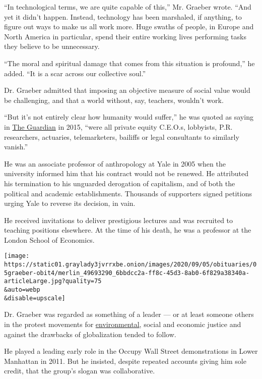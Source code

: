 ``In technological terms, we are quite capable of this,'' Mr. Graeber
wrote. ``And yet it didn't happen. Instead, technology has been
marshaled, if anything, to figure out ways to make us all work more.
Huge swaths of people, in Europe and North America in particular, spend
their entire working lives performing tasks they believe to be
unnecessary.

``The moral and spiritual damage that comes from this situation is
profound,'' he added. ``It is a scar across our collective soul.''

Dr. Graeber admitted that imposing an objective measure of social value
would be challenging, and that a world without, say, teachers, wouldn't
work.

``But it's not entirely clear how humanity would suffer,'' he was quoted
as saying in
\href{https://www.theguardian.com/books/2015/mar/21/books-interview-david-graeber-the-utopia-of-rules?paging=off}{The
Guardian} in 2015, ``were all private equity C.E.O.s, lobbyists, P.R.
researchers, actuaries, telemarketers, bailiffs or legal consultants to
similarly vanish.''

He was an associate professor of anthropology at Yale in 2005 when the
university informed him that his contract would not be renewed. He
attributed his termination to his unguarded derogation of capitalism,
and of both the political and academic establishments. Thousands of
supporters signed petitions urging Yale to reverse its decision, in
vain.

He received invitations to deliver prestigious lectures and was
recruited to teaching positions elsewhere. At the time of his death, he
was a professor at the London School of Economics.

\texttt{[image: https://static01.graylady3jvrrxbe.onion/images/2020/09/05/obituaries/05graeber-obit4/merlin\_49693290\_6bbdcc2a-ff8c-45d3-8ab0-6f829a38340a-articleLarge.jpg?quality=75\\\&auto=webp\\\&disable=upscale]}

Dr. Graeber was regarded as something of a leader --- or at least
someone others in the protest movements for
\href{https://www.nytimes3xbfgragh.onion/2019/05/01/opinion/extinction-rebellion-climate-change.html}{environmental},
social and economic justice and against the drawbacks of globalization
tended to follow.

He played a leading early role in the Occupy Wall Street demonstrations
in Lower Manhattan in 2011. But he insisted, despite repeated accounts
giving him sole credit, that the group's slogan was collaborative.

